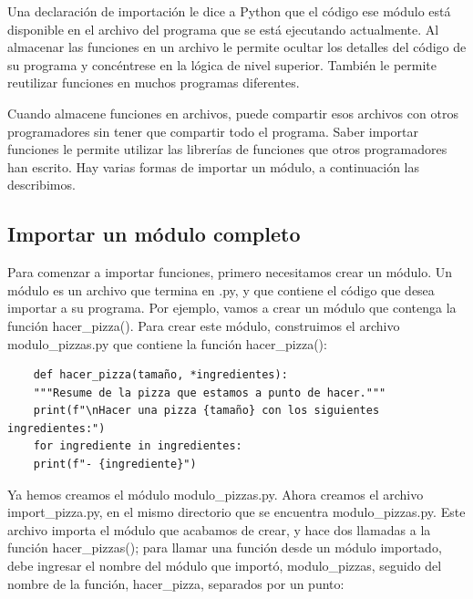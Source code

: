 Una declaración de importación le dice a Python que el código ese módulo está disponible en el archivo del programa que se está ejecutando actualmente. Al almacenar las funciones en un archivo  le permite ocultar los detalles del código de su programa y concéntrese en la lógica de nivel superior. También le permite reutilizar funciones en muchos programas diferentes. 

Cuando almacene funciones en archivos,  puede compartir esos archivos con otros programadores sin
tener que compartir todo el programa. Saber importar funciones le permite utilizar las librerías de funciones que otros programadores han escrito.  Hay varias formas de importar un módulo, a continuación las describimos.

\subsection{Importar un módulo completo}

Para comenzar a importar funciones, primero necesitamos crear un módulo. 
Un módulo es un archivo que termina en {\ttfamily .py}, y que contiene el código que desea importar a su programa. Por ejemplo, 
vamos a crear un módulo que contenga la función {\ttfamily hacer\_pizza()}. Para crear este módulo, construimos el
archivo {\ttfamily  modulo\_pizzas.py} que contiene la función {\ttfamily hacer\_pizza()}:


\hspace{-2.3cm}{\ttfamily \scriptsize modulo}

\vspace{-0.2cm}
\hspace{-2.4cm}{\ttfamily \scriptsize \_pizza.py}\vspace{-0.84cm}
\begin{lstlisting}		
	def hacer_pizza(tamaño, *ingredientes):
	"""Resume de la pizza que estamos a punto de hacer."""
	print(f"\nHacer una pizza {tamaño} con los siguientes ingredientes:")
	for ingrediente in ingredientes:
	print(f"- {ingrediente}")
\end{lstlisting}        

Ya hemos creamos el módulo  {\ttfamily modulo\_pizzas.py}. Ahora creamos el archivo {\ttfamily import\_pizza.py}, en el mismo directorio que se encuentra  {\ttfamily modulo\_pizzas.py}. Este archivo importa el módulo que acabamos de crear, y hace dos llamadas a la función {\ttfamily hacer\_pizzas()}; para llamar una función desde un módulo importado, debe ingresar el nombre del módulo que importó, {\ttfamily modulo\_pizzas}, seguido del nombre de la función, {\ttfamily hacer\_pizza}, separados por un punto: 


